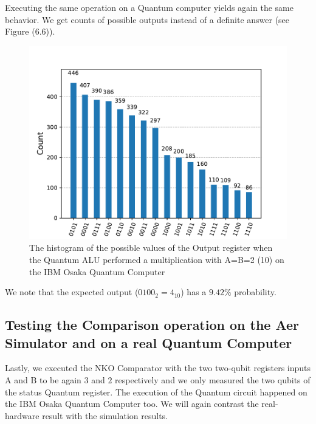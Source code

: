 Executing the same operation on a Quantum computer yields again the same behavior. We get counts of possible outputs instead of a definite answer (see Figure (6.6)).

\begin{figure}[!ht]
        \centering
        \includegraphics[scale=0.7]{images/6_Complete_System/multiplier_ibmq_result.pdf}
        \caption{The histogram of the possible values of the Output register when the Quantum ALU performed a multiplication with A=B=2 (10) on the IBM Osaka Quantum Computer}
\end{figure}

We note that the expected output ($0100_2=4_{10}$) has a $9.42\%$ probability.

\newpage
\subsection{Testing the Comparison operation on the Aer Simulator and on a real Quantum Computer}
Lastly, we executed the NKO Comparator with the two two-qubit registers inputs A and B to be again $3$ and $2$ respectively and we only measured the two qubits
of the status Quantum register. The execution of the Quantum circuit happened on the IBM Osaka Quantum Computer too. We will again contrast the real-hardware result with the
simulation results.

